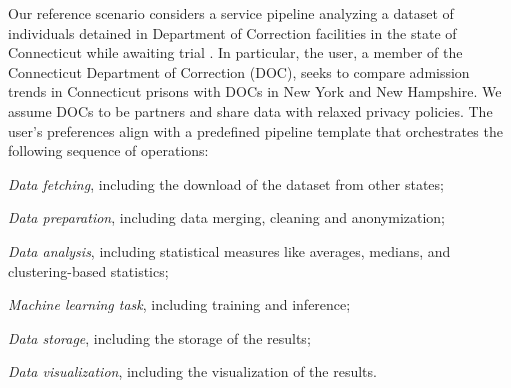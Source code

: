 Our reference scenario considers a service pipeline analyzing a dataset of individuals detained in Department of Correction facilities in the state of Connecticut while awaiting trial \cite{toadd}.
In particular, the user, a member of the Connecticut Department of Correction (DOC), seeks to compare admission trends in Connecticut prisons with DOCs in New York and New Hampshire. We assume DOCs to be partners and share data with relaxed privacy policies.
The user's preferences align with a predefined pipeline template that orchestrates the following sequence of operations:
\begin{enumerate*}[label=(\roman*)]
  \item \emph{Data fetching}, including the download of the dataset from other states;
  \item \emph{Data preparation}, including data merging, cleaning and anonymization;
  \item \emph{Data analysis}, including statistical measures like averages, medians, and clustering-based statistics;
  \item \emph{Machine learning task}, including training and inference;
  \item \emph{Data storage}, including the storage of the results;
  \item \emph{Data visualization}, including the visualization of the results.
\end{enumerate*}

